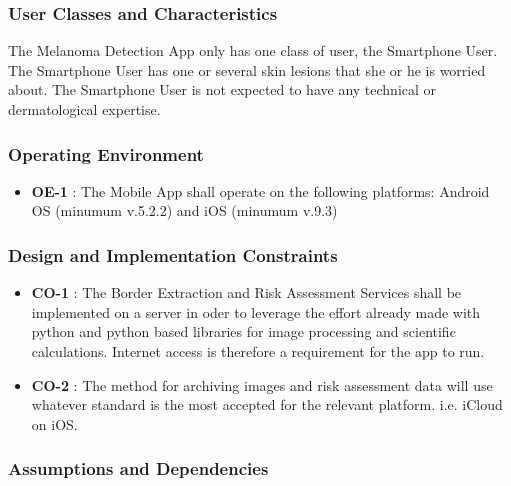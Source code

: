         \subsubsection{User Classes and Characteristics}

            The Melanoma Detection App only has one class of user, the Smartphone User. The Smartphone User has one or several skin lesions that she or he is worried about.
The Smartphone User is not expected to have any technical or dermatological expertise.

        \subsubsection{Operating Environment}

                    \noindent
                    \begin{itemize}[leftmargin=*]
                        \item[]  \textbf{OE-1} : The Mobile App shall operate on the following platforms: Android OS (minumum v.5.2.2) and iOS (minumum v.9.3)

                    \end{itemize}


        \subsubsection{Design and Implementation Constraints}

                    \noindent
                    \begin{itemize}[leftmargin=*]
                        \item[]  \textbf{CO-1} : The Border Extraction and Risk Assessment Services shall be implemented on a server in oder to leverage the effort already made with python and python based libraries for image processing and scientific calculations. Internet access is therefore a requirement for the app to run.
                        \item[]  \textbf{CO-2} : The method for archiving images and risk assessment data will use whatever standard is the most accepted for the relevant platform. i.e. iCloud on iOS.


                    \end{itemize}

        \subsubsection{Assumptions and Dependencies}

